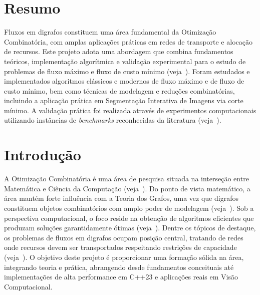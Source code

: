 \documentclass[12pt,a4paper]{article}
\begin{document}
\section{Resumo}\label{sec:resumo}

Fluxos em digrafos constituem uma área fundamental da Otimização Combinatória, com amplas aplicações práticas em redes de transporte e alocação de recursos. Este projeto adota uma abordagem que combina fundamentos teóricos, implementação algorítmica e validação experimental para o estudo de problemas de fluxo máximo e fluxo de custo mínimo (veja~\cite{ahuja1993network}). Foram estudados e implementados algoritmos clássicos e modernos de fluxo máximo e de fluxo de custo mínimo, bem como técnicas de modelagem e reduções combinatórias, incluindo a aplicação prática em Segmentação Interativa de Imagens via corte mínimo. A validação prática foi realizada através de experimentos computacionais utilizando instâncias de \textit{benchmarks} reconhecidas da literatura (veja~\cite{Jensen2022}).

\vspace{0.35cm}

\section{Introdução}\label{sec:introducao}

A Otimização Combinatória é uma área de pesquisa situada na interseção entre Matemática e Ciência da Computação (veja~\cite{korte2018combinatorial}). Do ponto de vista matemático, a área mantém forte influência com a Teoria dos Grafos, uma vez que digrafos constituem objetos combinatórios com amplo poder de modelagem (veja~\cite{bondy2008graph, diestel2017graph}).
Sob a perspectiva computacional, o foco reside na obtenção de algoritmos eficientes que produzam soluções garantidamente ótimas (veja~\cite{schrijver2003combinatorial, cook1998combinatorial}). Dentre os tópicos de destaque, os problemas de fluxos em digrafos ocupam posição central, tratando de redes onde recursos devem ser transportados respeitando restrições de capacidade (veja~\cite{ahuja1993network}).
O objetivo deste projeto é proporcionar uma formação sólida na área, integrando teoria e prática, abrangendo desde fundamentos conceituais até implementações de alta performance em C++23 e aplicações reais em Visão Computacional.
\end{document}
